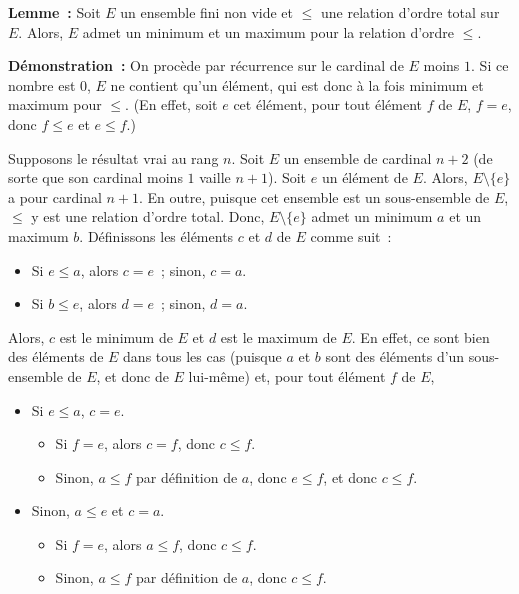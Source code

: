     \done

\medskip

\noindent\textbf{Lemme :} Soit $E$ un ensemble fini non vide et $\leq$ une relation d'ordre total sur $E$.
    Alors, $E$ admet un minimum et un maximum pour la relation d'ordre $\leq$.

\medskip

\noindent\textbf{Démonstration :} On procède par récurrence sur le cardinal de $E$ moins $1$.
    Si ce nombre est $0$, $E$ ne contient qu'un élément, qui est donc à la fois minimum et maximum pour $\leq$.
    (En effet, soit $e$ cet élément, pour tout élément $f$ de $E$, $f = e$, donc $f \leq e$ et $e \leq f$.)
    
    Supposons le résultat vrai au rang $n$. 
    Soit $E$ un ensemble de cardinal $n+2$ (de sorte que son cardinal moins $1$ vaille $n+1$).
    Soit $e$ un élément de $E$.
    Alors, $E \setminus \lbrace e \rbrace$ a pour cardinal $n+1$. 
    En outre, puisque cet ensemble est un sous-ensemble de $E$, $\leq$ y est une relation d'ordre total.
    Donc, $E \setminus \lbrace e \rbrace$ admet un minimum $a$ et un maximum $b$. 
    Définissons les éléments $c$ et $d$ de $E$ comme suit : 
    \begin{itemize}[nosep]
        \item Si $e \leq a$, alors $c = e$ ; sinon, $c = a$.
        \item Si $b \leq e$, alors $d = e$ ; sinon, $d = a$.
    \end{itemize}
    Alors, $c$ est le minimum de $E$ et $d$ est le maximum de $E$.
    En effet, ce sont bien des éléments de $E$ dans tous les cas (puisque $a$ et $b$ sont des éléments d'un sous-ensemble de $E$, et donc de $E$ lui-même) et, pour tout élément $f$ de $E$, 
    \begin{itemize}[nosep]
        \item Si $e \leq a$, $c = e$.
            \begin{itemize}[nosep]
                \item Si $f = e$, alors $c = f$, donc $c \leq f$.
                \item Sinon, $a \leq f$ par définition de $a$, donc $e \leq f$, et donc $c \leq f$.
            \end{itemize}
        \item Sinon, $a \leq e$ et $c = a$.
            \begin{itemize}[nosep]
                \item Si $f = e$, alors $a \leq f$, donc $c \leq f$.
                \item Sinon, $a \leq f$ par définition de $a$, donc $c \leq f$.
            \end{itemize}
    \end{itemize}
